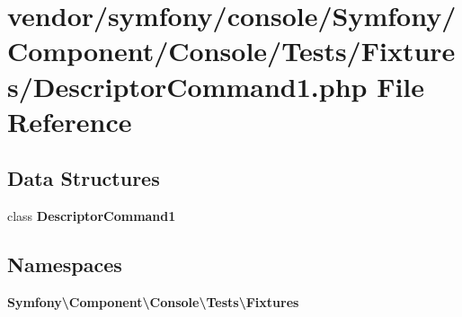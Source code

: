 \section{vendor/symfony/console/\+Symfony/\+Component/\+Console/\+Tests/\+Fixtures/\+Descriptor\+Command1.php File Reference}
\label{_descriptor_command1_8php}
\subsection*{Data Structures}
\begin{DoxyCompactItemize}
\item 
class {\bf Descriptor\+Command1}
\end{DoxyCompactItemize}
\subsection*{Namespaces}
\begin{DoxyCompactItemize}
\item 
 {\bf Symfony\textbackslash{}\+Component\textbackslash{}\+Console\textbackslash{}\+Tests\textbackslash{}\+Fixtures}
\end{DoxyCompactItemize}
